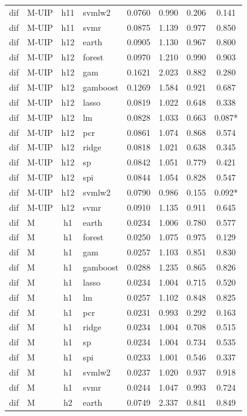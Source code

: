 \begin{ThreePartTable}
\begin{longtable}[t]{llclcccc}
dif & M-UIP & h11 & svmlw2 & 0.0760 & 0.990 & 0.206 & 0.141\\
dif & M-UIP & h11 & svmr & 0.0875 & 1.139 & 0.977 & 0.850\\
\addlinespace
dif & M-UIP & h12 & earth & 0.0905 & 1.130 & 0.967 & 0.800\\
dif & M-UIP & h12 & forest & 0.0970 & 1.210 & 0.990 & 0.903\\
dif & M-UIP & h12 & gam & 0.1621 & 2.023 & 0.882 & 0.280\\
dif & M-UIP & h12 & gamboost & 0.1269 & 1.584 & 0.921 & 0.687\\
dif & M-UIP & h12 & lasso & 0.0819 & 1.022 & 0.648 & 0.338\\
dif & M-UIP & h12 & lm & 0.0828 & 1.033 & 0.663 & 0.087*\\
dif & M-UIP & h12 & pcr & 0.0861 & 1.074 & 0.868 & 0.574\\
dif & M-UIP & h12 & ridge & 0.0818 & 1.021 & 0.638 & 0.345\\
dif & M-UIP & h12 & sp & 0.0842 & 1.051 & 0.779 & 0.421\\
dif & M-UIP & h12 & spi & 0.0844 & 1.054 & 0.828 & 0.547\\
dif & M-UIP & h12 & svmlw2 & 0.0790 & 0.986 & 0.155 & 0.092*\\
dif & M-UIP & h12 & svmr & 0.0910 & 1.135 & 0.911 & 0.645\\
\addlinespace
dif & M & h1 & earth & 0.0234 & 1.006 & 0.780 & 0.577\\
dif & M & h1 & forest & 0.0250 & 1.075 & 0.975 & 0.129\\
dif & M & h1 & gam & 0.0257 & 1.103 & 0.851 & 0.830\\
dif & M & h1 & gamboost & 0.0288 & 1.235 & 0.865 & 0.826\\
dif & M & h1 & lasso & 0.0234 & 1.004 & 0.715 & 0.520\\
dif & M & h1 & lm & 0.0257 & 1.102 & 0.848 & 0.825\\
dif & M & h1 & pcr & 0.0231 & 0.993 & 0.292 & 0.163\\
dif & M & h1 & ridge & 0.0234 & 1.004 & 0.708 & 0.515\\
dif & M & h1 & sp & 0.0234 & 1.004 & 0.734 & 0.535\\
dif & M & h1 & spi & 0.0233 & 1.001 & 0.546 & 0.337\\
dif & M & h1 & svmlw2 & 0.0237 & 1.020 & 0.937 & 0.918\\
dif & M & h1 & svmr & 0.0244 & 1.047 & 0.993 & 0.724\\
\addlinespace
dif & M & h2 & earth & 0.0749 & 2.337 & 0.841 & 0.849\\

\end{longtable}
\end{ThreePartTable}
